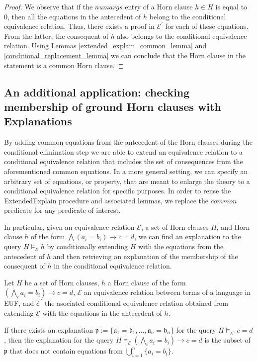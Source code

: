 \begin{proof}
  We observe that if the $numargs$ entry of a Horn clause
  $h \in H$ is equal to 0, then 
  all the equations in the antecedent of $h$ belong 
  to the conditional equivalence relation. Thus, 
  there exists a proof in $\mathcal{E^{'}}$ for
  each of these equations. From the latter, the consequent
  of $h$ also belongs to the conditional equivalence
  relation. Using Lemmas \ref{extended_explain_common_lemma}
  and \ref{conditional_replacement_lemma} we can conclude that
  the Horn clause in the statement is a common Horn clause.
\end{proof}

\subsection{An additional application: checking
  membership of ground Horn clauses 
with Explanations}

By adding common equations
from the antecedent of the Horn clauses during the 
conditional elimination step we are able to 
extend an equivalence relation to a conditional
equivalence relation that includes the set 
of consequences from the aforementioned common equations.
In a more general setting, we can specify an arbitrary
set of equations, or property, 
that are meant to enlarge the theory
to a conditional equivalence relation for 
specific purposes. In order to reuse the ExtendedExplain
procedure and associated lemmas, we replace the $common$
predicate for any predicate of interest.

In particular, given an equivalence relation $\mathcal{E}$, a 
set of Horn clauses $H$, and Horn clause $h$ of the form 
$\bigwedge (a_i = b_i) \rightarrow c = d$, we can 
find an explanation to the query $H \models_{\mathcal{E}} h$
by conditionally extending $H$ with the equations
from the antecedent of $h$ and then retrieving an explanation
of the membership of the consequent of $h$ in the conditional 
equivalence relation.

\begin{lemma}
  Let $H$ be a set of Horn clauses, $h$ a Horn clause of the
  form $(\bigwedge_i a_i = b_i) \rightarrow c = d$, 
  $\mathcal{E}$ an equivalence relation between terms 
  of a language in EUF, and $\mathcal{E^{'}}$ the asociated
  conditional equivalence relation obtained from extending
  $\mathcal{E}$ with the equations in the antecedent of $h$.

  If there exists an explanation 
  $\mathfrak{p} := \{\mathfrak{a}_1 = \mathfrak{b}_1,
  \dots, \mathfrak{a}_n = \mathfrak{b}_n\}$ 
  for the query $H \models_{\mathcal{E^{'}}} c = d$,
  then the explanation for the query 
  $H \models_{\mathcal{E}} (\bigwedge_i a_i = b_i) 
  \rightarrow c = d$ is the subset of $\mathfrak{p}$
  that does not contain equations from 
  $\bigcup_{i=1}^n\{a_i = b_i\}$.
\end{lemma}

